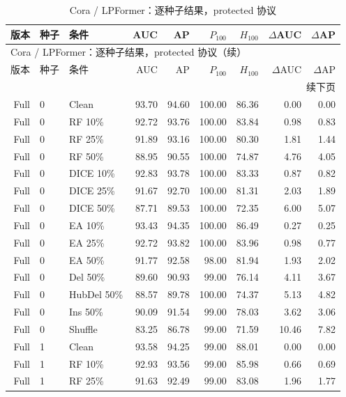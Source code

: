 {\footnotesize
\setlength{\tabcolsep}{3.2pt}
\renewcommand{\arraystretch}{1.10}
\begin{longtable}{rllrrrrrr}
\caption{Cora / LPFormer：逐种子结果，protected 协议}\\
\toprule
版本 & 种子 & 条件 & AUC & AP & $P_{100}$ & $H_{100}$ & $\Delta$AUC & $\Delta$AP \\
\midrule
\endfirsthead
\multicolumn{9}{l}{Cora / LPFormer：逐种子结果，protected 协议（续）}\\
\toprule
版本 & 种子 & 条件 & AUC & AP & $P_{100}$ & $H_{100}$ & $\Delta$AUC & $\Delta$AP \\
\midrule
\endhead
\midrule\multicolumn{9}{r}{续下页}\\
\endfoot
\bottomrule
\endlastfoot
Full & 0 & Clean & 93.70 & 94.60 & 100.00 & 86.36 & 0.00 & 0.00 \\
Full & 0 & RF 10\% & 92.72 & 93.76 & 100.00 & 83.84 & 0.98 & 0.83 \\
Full & 0 & RF 25\% & 91.89 & 93.16 & 100.00 & 80.30 & 1.81 & 1.44 \\
Full & 0 & RF 50\% & 88.95 & 90.55 & 100.00 & 74.87 & 4.76 & 4.05 \\
Full & 0 & DICE 10\% & 92.83 & 93.78 & 100.00 & 83.33 & 0.87 & 0.82 \\
Full & 0 & DICE 25\% & 91.67 & 92.70 & 100.00 & 81.31 & 2.03 & 1.89 \\
Full & 0 & DICE 50\% & 87.71 & 89.53 & 100.00 & 72.35 & 6.00 & 5.07 \\
Full & 0 & EA 10\% & 93.43 & 94.35 & 100.00 & 86.49 & 0.27 & 0.25 \\
Full & 0 & EA 25\% & 92.72 & 93.82 & 100.00 & 83.96 & 0.98 & 0.77 \\
Full & 0 & EA 50\% & 91.77 & 92.58 & 98.00 & 81.94 & 1.93 & 2.02 \\
Full & 0 & Del 50\% & 89.60 & 90.93 & 99.00 & 76.14 & 4.11 & 3.67 \\
Full & 0 & HubDel 50\% & 88.57 & 89.78 & 100.00 & 74.37 & 5.13 & 4.82 \\
Full & 0 & Ins 50\% & 90.09 & 91.54 & 99.00 & 78.03 & 3.62 & 3.06 \\
Full & 0 & Shuffle & 83.25 & 86.78 & 99.00 & 71.59 & 10.46 & 7.82 \\
Full & 1 & Clean & 93.58 & 94.25 & 99.00 & 88.01 & 0.00 & 0.00 \\
Full & 1 & RF 10\% & 92.93 & 93.56 & 99.00 & 85.98 & 0.66 & 0.69 \\
Full & 1 & RF 25\% & 91.63 & 92.49 & 99.00 & 83.08 & 1.96 & 1.77 \\

\end{longtable}}
